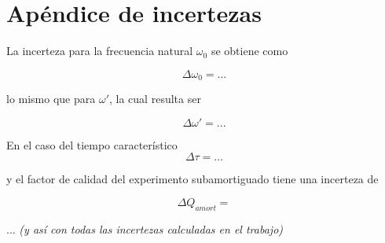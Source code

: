 \documentclass[12pt,a4paper]{article}
\begin{document}
\section{Apéndice de incertezas}

La incerteza para la frecuencia natural $\omega_0$ se obtiene como

\begin{equation}
    \Delta\omega_0= ...
\end{equation}
 
lo mismo que para $\omega'$, la cual resulta ser

\begin{equation}
    \Delta\omega'= ...
\end{equation}

En el caso del tiempo característico
\begin{equation}
    \Delta \tau = ...
\end{equation}

y el factor de calidad del experimento subamortiguado tiene una incerteza de

\begin{equation}
    \Delta Q_{amort} = 
\end{equation}

... \textit{(y así con todas las incertezas calculadas en el trabajo)}
\end{document}
